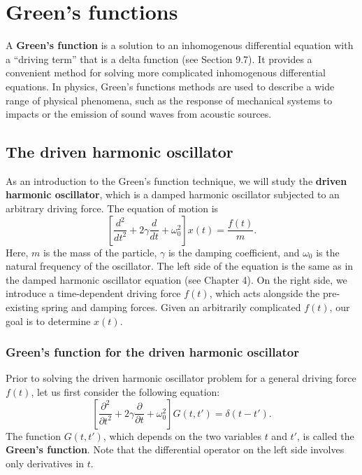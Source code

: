 \documentclass[10pt,a4paper]{article}
\begin{document}
\setcounter{page}{86}

\section{Green's functions}
\label{greens-functions}

A \textbf{Green's function} is a solution to an inhomogenous
differential equation with a ``driving term'' that is a delta function
(see Section 9.7). It provides a convenient method for solving more
complicated inhomogenous differential equations. In physics, Green's
functions methods are used to describe a wide range of physical
phenomena, such as the response of mechanical systems to impacts or
the emission of sound waves from acoustic sources.

\subsection{The driven harmonic oscillator}
\label{the-driven-harmonic-oscillator}

As an introduction to the Green's function technique, we will study
the \textbf{driven harmonic oscillator}, which is a damped harmonic
oscillator subjected to an arbitrary driving force.  The equation of
motion is
\begin{equation}
\left[\frac{d^2}{dt^2} + 2 \gamma \frac{d}{dt} + \omega_0^2\right] x(t) = \frac{f(t)}{m}.
\end{equation}
Here, $m$ is the mass of the particle, $\gamma$ is the damping
coefficient, and $\omega_0$ is the natural frequency of the
oscillator. The left side of the equation is the same as in the damped
harmonic oscillator equation (see Chapter 4). On the right side, we
introduce a time-dependent driving force $f(t)$, which acts alongside
the pre-existing spring and damping forces. Given an arbitrarily
complicated $f(t)$, our goal is to determine $x(t)$.

\subsubsection{Green's function for the driven harmonic oscillator}
\label{greens-function-for-the-driven-harmonic-oscillator}

Prior to solving the driven harmonic oscillator problem for a general
driving force $f(t)$, let us first consider the following equation:
\begin{equation}
\left[\frac{\partial^2}{\partial t^2} + 2 \gamma \frac{\partial}{\partial t} + \omega_0^2\right] G(t, t') = \delta(t-t').
\label{greenfuneq}
\end{equation}
The function $G(t,t')$, which depends on the two variables $t$ and
$t'$, is called the \textbf{Green's function}. Note that the
differential operator on the left side involves only derivatives in
$t$.
\end{document}
